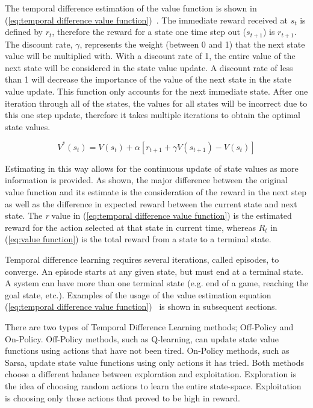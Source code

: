 \documentclass[12pt,american]{report}
\begin{document}
The temporal difference estimation of the value function is shown in (\ref{eq:temporal difference value function})~\cite{Eden}. The immediate reward received at \textit{$s_t$} is defined by \textit{$r_t$}, therefore the reward for a state one time step out (\textit{$s_{t+1}$}) is \textit{$r_{t+1}$}. The discount rate, \textit{$\gamma$}, represents the weight (between 0 and 1) that the next state value will be multiplied with.  With a discount rate of 1, the entire value of the next state will be considered in the state value update. A discount rate of less than 1 will decrease the importance of the value of the next state in the state value update.  This function only accounts for the next immediate state.  After one iteration through all of the states, the values for all states will be incorrect due to this one step update, therefore it takes multiple iterations to obtain the optimal state values.
               
        \begin{equation}
            \label{eq:temporal difference value function}
            V^*(s_{t}) = V(s_{t}) + \alpha[r_{t+1} + \gamma V(s_{t+1})-V(s_{t})]
        \end{equation}
        
        Estimating in this way allows for the continuous update of state values as more information is provided. As shown, the major difference between the original value function and its estimate is the consideration of the reward in the next step as well as the difference in expected reward between the current state and next state. The \textit{r} value in (\ref{eq:temporal difference value function}) is the estimated reward for the action selected at that state in current time, whereas \textit{$R_t$} in (\ref{eq:value function}) is the total reward from a state to a terminal state. 

Temporal difference learning requires several iterations, called episodes, to converge. An episode starts at any given state, but must end at a terminal state.  A system can have more than one terminal state (e.g. end of a game, reaching the goal state, etc.). Examples of the usage of the value estimation equation (\ref{eq:temporal difference value function})~\cite{Eden} is shown in subsequent sections.

There are two types of Temporal Difference Learning methods; Off-Policy and On-Policy. Off-Policy methods, such as Q-learning, can update state value functions using actions that have not been tired. On-Policy methods, such as Sarsa, update state value functions using only actions it has tried.  Both methods choose a different balance between exploration and exploitation.  Exploration is the idea of choosing random actions to learn the entire state-space.  Exploitation is choosing only those actions that proved to be high in reward.
        
\end{document}
